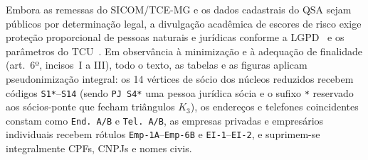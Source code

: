 Embora as remessas do SICOM/TCE-MG e os dados cadastrais do QSA sejam públicos por determinação legal, a divulgação acadêmica de escores de risco exige proteção proporcional de pessoas naturais e jurídicas conforme a LGPD~\cite{brasil2018lgpd} e os parâmetros do TCU~\cite{tcu2011acordao2341,tcu2024acordao1798}. Em observância à minimização e à adequação de finalidade (art.~6º, incisos~I a III), todo o texto, as tabelas e as figuras aplicam pseudonimização integral: os 14 vértices de sócio dos núcleos reduzidos recebem códigos \texttt{S1*}--\texttt{S14} (sendo \texttt{PJ S4*} uma pessoa jurídica sócia e o sufixo \texttt{*} reservado aos sócios-ponte que fecham triângulos $K_3$), os endereços e telefones coincidentes constam como \texttt{End.~A/B} e \texttt{Tel.~A/B}, as empresas privadas e empresários individuais recebem rótulos \texttt{Emp-1A}--\texttt{Emp-6B} e \texttt{EI-1}--\texttt{EI-2}, e suprimem-se integralmente CPFs, CNPJs e nomes civis. %
